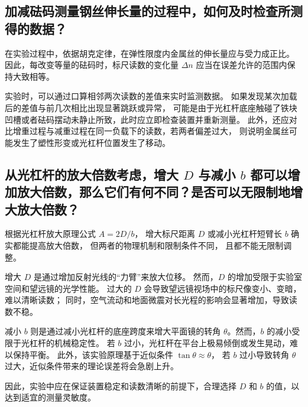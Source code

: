 \documentclass{../../templates/Report}%
\begin{document}
\begin{fullreportonly}
    \subsection{加减砝码测量钢丝伸长量的过程中，如何及时检查所测得的数据？}

    在实验过程中，依据胡克定律，在弹性限度内金属丝的伸长量应与受力成正比。
    因此，每改变等量的砝码时，标尺读数的变化量 $\Delta n$ 应当在误差允许的范围内保持大致相等。

    实验时，可以通过口算相邻两次读数的差值来实时监测数据。
    如果发现某次加载后的差值与前几次相比出现显著跳跃或异常，
    可能是由于光杠杆底座触碰了铁块凹槽或者砝码摆动未静止所致，此时应立即检查装置并重新测量。
    此外，还应对比增重过程与减重过程在同一负载下的读数，若两者偏差过大，
    则说明金属丝可能发生了塑性形变或光杠杆位置发生了移动。

    \subsection{从光杠杆的放大倍数考虑，增大 $D$ 与减小 $b$ 都可以增加放大倍数，那么它们有何不同？是否可以无限制地增大放大倍数？}

    根据光杠杆放大原理公式 $A = 2D/b$，
    增大标尺距离 $D$ 或减小光杠杆短臂长 $b$ 确实都能提高放大倍数，
    但两者的物理机制和限制条件不同，
    且都不能无限制调整。

    增大 $D$ 是通过增加反射光线的“力臂”来放大位移。
    然而，$D$ 的增加受限于实验室空间和望远镜的光学性能。
    过大的 $D$ 会导致望远镜视场中的标尺像变小、变暗，难以清晰读数；
    同时，空气流动和地面微震对长光程的影响会显著增加，导致读数不稳。

    减小 $b$ 则是通过减小光杠杆的底座跨度来增大平面镜的转角 $\theta$。然而，$b$ 的减小受限于光杠杆的机械稳定性。
    若 $b$ 过小，光杠杆在平台上极易倾倒或发生晃动，难以保持平衡。
    此外，该实验原理基于近似条件 $\tan\theta \approx \theta$，
    若 $b$ 过小导致转角 $\theta$ 过大，近似条件带来的理论误差将会急剧上升。

    因此，实验中应在保证装置稳定和读数清晰的前提下，合理选择 $D$ 和 $b$ 的值，以达到适宜的测量灵敏度。
\end{fullreportonly}
\insertnotes
\end{document}
